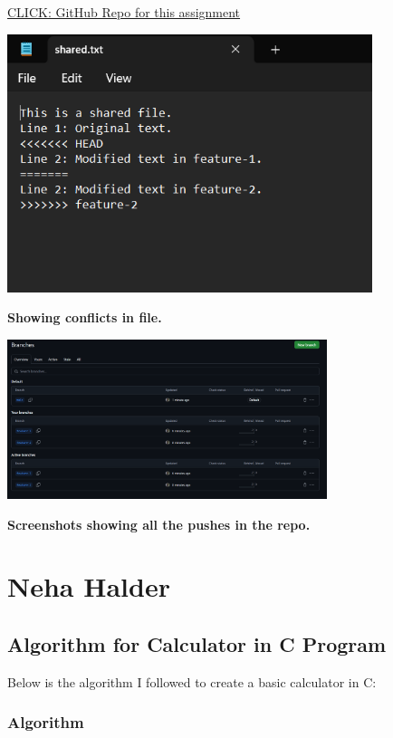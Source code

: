 \documentclass[a4paper,12pt]{article}
\begin{document}
\href{https://github.com/codeAtSin/git-advanced}{CLICK: GitHub Repo for this assignment}
\par\vspace{2em}
\includegraphics[width=0.8\textwidth]{conflictfile.png}
\par\vspace{2em}
\large\textbf{Showing conflicts in file.}
\par\vspace{2em}
\includegraphics[width=0.7\textwidth]{allpushes.png}
\par\vspace{2em}
\large\textbf{Screenshots showing all the pushes in the repo.}
\vspace{0.3in}


\newpage
\section{Neha Halder}

\subsection{Algorithm for Calculator in C Program}

Below is the algorithm I followed to create a basic calculator in C:

\subsubsection*{Algorithm}
\end{document}
